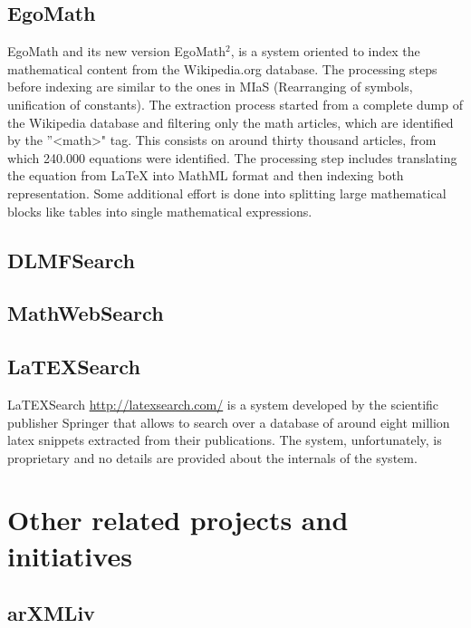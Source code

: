 \subsection{EgoMath}
EgoMath\cite{egomath1} and its new version EgoMath$^2$\cite{egomath2}, is a system oriented to index the mathematical content from the Wikipedia.org database. The processing steps before indexing are similar to the ones in MIaS (Rearranging of symbols, unification of constants). The extraction process started from a complete dump of the Wikipedia database and filtering only the math articles, which are identified by the ”<math>" tag. This consists on around thirty thousand articles, from which 240.000 equations were identified. The processing step includes translating the equation from LaTeX into MathML format and then indexing both representation.
Some additional effort is done into splitting large mathematical blocks like tables into single mathematical expressions.

\subsection{DLMFSearch}
\subsection{MathWebSearch}
\subsection{LaTEXSearch}
LaTEXSearch \url{http://latexsearch.com/} is a system developed by the scientific publisher Springer that allows to search over a database of around eight million latex snippets extracted from their publications. The system, unfortunately, is proprietary and no details are provided about the internals of the system.
	 
\section{Other related projects and initiatives}
\subsection{arXMLiv}
\thispagestyle{empty}